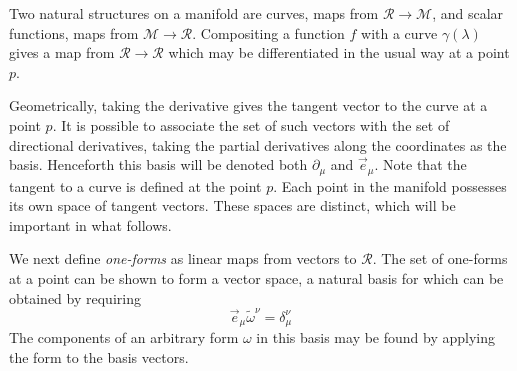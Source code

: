 Two natural structures on a manifold are curves, maps from
$\mathcal{R}\to\mathcal{M}$, and scalar functions,  maps from
$\mathcal{M}\to\mathcal{R}$.  Compositing a function $f$ with a curve
$\gamma(\lambda)$ gives a map from $\mathcal{R} \rightarrow
\mathcal{R}$ which may be differentiated in the usual way at a point
$p$.

Geometrically, taking the derivative gives the tangent vector to the
curve at a point $p$.  It is possible to associate the set of such
vectors with the set of directional derivatives, taking the partial
derivatives along the coordinates as the basis.  Henceforth this basis
will be denoted both $\partial_\mu$ and $\vec{e}_\mu$.  Note that the
tangent to a curve is defined at the point $p$.  Each point in the
manifold possesses its own space of tangent vectors.  These spaces are
distinct, which will be important in what follows.

We next define \emph{one-forms} as linear maps from vectors to
$\mathcal{R}$.  The set of one-forms at a point can be shown to form a
vector space, a natural basis for which can be obtained by requiring
%
\begin{equation*}
\vec{e}_\mu \tilde{\omega}^\nu = \delta_\mu^\nu
\end{equation*}
%
The components of an arbitrary form $\omega$ in this basis may be
found by applying the form to the basis vectors.

